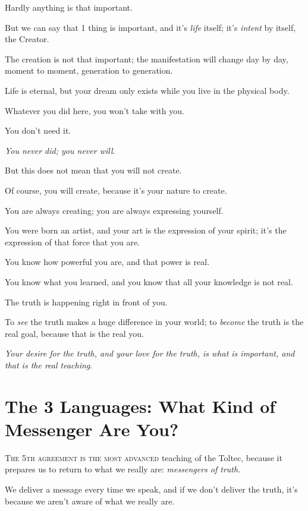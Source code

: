 \documentclass{article}
\numberwithin{equation}{section}
\begin{document}
Hardly anything is that important.

But we can say that 1 thing is important, and it's \textit{life} itself; it's \textit{intent} by itself, the Creator.

The creation is not that important; the manifestation will change day by day, moment to moment, generation to generation.

Life is eternal, but your dream only exists while you live in the physical body.

Whatever you did here, you won't take with you.

You don't need it.

\textit{You never did; you never will}.

%
But this does not mean that you will not create.

Of course, you will create, because it's your nature to create.

You are always creating; you are always expressing yourself.

You were born an artist, and your art is the expression of your spirit; it's the expression of that force that you are.

You know how powerful you are, and that power is real.

You know what you learned, and you know that all your knowledge is not real.

%
The truth is happening right in front of you.


To \textit{see} the truth makes a huge difference in your world; to \textit{become} the truth is the real goal, because that is the real you.


\textit{Your desire for the truth, and your love for the truth, is what is important, and that is the real teaching}.

\section{The 3 Languages: What Kind of Messenger Are You?}
\textsc{The 5th agreement is the most advanced} teaching of the Toltec, because it prepares us to return to what we really are: \textit{messengers of truth}.

We deliver a message every time we speak, and if we don't deliver the truth, it's because we aren't aware of what we really are.
\end{document}

